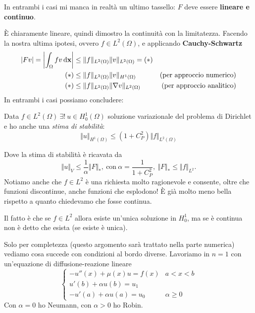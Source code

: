 In entrambi i casi mi manca in realtà un ultimo tassello: $F$ deve essere \textbf{lineare e continuo}.

È chiaramente lineare, quindi dimostro la continuità con la limitatezza. Facendo la nostra ultima ipotesi, ovvero $\displaystyle f\in L^{2}(\Omega)$, e applicando \textbf{Cauchy-Schwartz}
\begin{align*}
    | Fv| =\left| \int _{\Omega } fv\,\mathrm d \mathbf{x}\right| & \leq \Vert f\Vert _{L^{2}(\Omega)}\Vert v\Vert _{L^{2}(\Omega)} =(*)   &                                  \\
    (*)                                         & \leq \Vert f\Vert _{L^{2}(\Omega)}\Vert v\Vert _{H^{1}(\Omega)}        & \text{(per approccio numerico)}  \\
    (*)                                         & \leq \Vert f\Vert _{L^{2}(\Omega)}\Vert \nabla v\Vert _{L^{2}(\Omega)} & \text{(per approccio analitico)}
\end{align*}
In entrambi i casi possiamo concludere:
\begin{theorem}
    Data $\displaystyle f\in L^{2}(\Omega) \ \exists !\ u\in H_{0}^{1}(\Omega)$ soluzione variazionale del problema di Dirichlet e ho anche una \textit{stima di stabilità}:
    \begin{equation*}
        \Vert u\Vert _{H^{1}(\Omega)} \leq \left(1+C_{P}^{2}\right)\Vert f\Vert _{L^{2}(\Omega)}
    \end{equation*}
\end{theorem}
Dove la stima di stabilità è ricavata da
\begin{equation*}
    \Vert u\Vert _{V} \leq \frac{1}{\alpha }\Vert F\Vert _{*} ,\ \text{con} \ \alpha =\frac{1}{1+C_{P}^{2}} ,\ \Vert F\Vert _{*} \leq \Vert f\Vert _{L^{2}} .
\end{equation*}
Notiamo anche che $\displaystyle f\in L^{2}$ è una richiesta molto ragionevole e consente, oltre che funzioni discontinue, anche funzioni che esplodono! È già molto meno bella rispetto a quanto chiedevamo che fosse continua.

Il fatto è che se $\displaystyle f\in L^{2}$ allora esiste un'unica soluzione in $\displaystyle H_{0}^{1}$, ma se è continua non è detto che esista (se esiste è unica).

Solo per completezza (questo argomento sarà trattato nella parte numerica) vediamo cosa succede con condizioni al bordo diverse. Lavoriamo in $n=1$ con un'equazione di diffusione-reazione lineare
\begin{equation*}
    \begin{cases}
        -u''(x) +\mu (x) u=f(x)    & a< x< b            \\
        u'(b) +\alpha u(b) =u_{1}  &                    \\
        -u'(a) +\alpha u(a) =u_{0} & \alpha \geq 0
    \end{cases}
\end{equation*}
Con $\displaystyle \alpha =0$ ho Neumann, con $\displaystyle \alpha  >0$ ho Robin.

